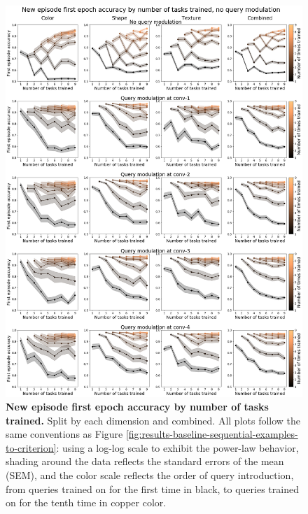 \begin{figure}[!htb]
\centering
\includegraphics[width=\linewidth]{ch-results/figures/query_mod_benchmark/first_episode_accuracy_per_modualtion_level_tasks_trained.png}
\caption[New episode first epoch accuracy by number of tasks trained.]{ {\bf New episode first epoch accuracy by number of tasks trained.} Split by each dimension and combined. All plots follow the same conventions as Figure \ref{fig:results-baseline-sequential-examples-to-criterion}: using a log-log scale to exhibit the power-law behavior, shading around the data reflects the standard errors of the mean (SEM), and the color scale reflects the order of query introduction, from queries trained on for the first time in black, to queries trained on for the tenth time in copper color. }
\label{fig:results-query-mod-benchmark-first-episode-accuracy-per-modualtion-level-tasks-trained}
\end{figure}
